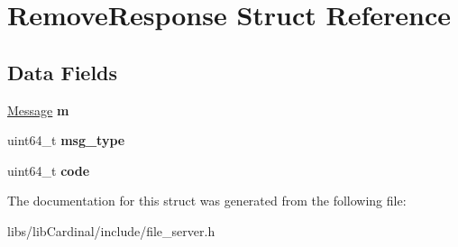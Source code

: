 \hypertarget{structRemoveResponse}{}\section{Remove\+Response Struct Reference}
\label{structRemoveResponse}
\subsection*{Data Fields}
\begin{DoxyCompactItemize}
\item 
\hyperlink{structMessage}{Message} {\bfseries m}\hypertarget{structRemoveResponse_a8146ec7c87659b975a037687bc6b4c28}{}\label{structRemoveResponse_a8146ec7c87659b975a037687bc6b4c28}

\item 
uint64\+\_\+t {\bfseries msg\+\_\+type}\hypertarget{structRemoveResponse_a3bd2b848b05531e0e24803f54dd958fb}{}\label{structRemoveResponse_a3bd2b848b05531e0e24803f54dd958fb}

\item 
uint64\+\_\+t {\bfseries code}\hypertarget{structRemoveResponse_a477890489c6067c8f06208145a3cd7a5}{}\label{structRemoveResponse_a477890489c6067c8f06208145a3cd7a5}

\end{DoxyCompactItemize}


The documentation for this struct was generated from the following file\+:\begin{DoxyCompactItemize}
\item 
libs/lib\+Cardinal/include/file\+\_\+server.\+h\end{DoxyCompactItemize}
